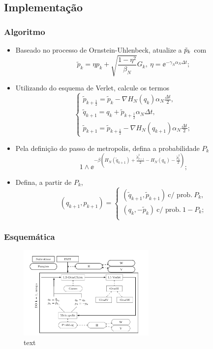 \subsection{Implementação}
\begin{frame}
	\frametitle{Algoritmo}
	
		\begin{itemize}		
			\item<1> Baseado no processo de Ornstein-Uhlenbeck, atualize a $\tilde{p}_k$ com
			$$
				\tilde{p}_k = \eta p_k + \sqrt{\frac{1-\eta^2}{\beta_N}} G_k, \ \eta = \ee^{-\gamma_N \alpha_N \Delta t};
				\label{Equation: Alg Mehler}
			$$
			\item<2> Utilizando do esquema de Verlet, calcule os termos
			$$
				\begin{cases}
					\tilde{p}_{k+\frac{1}{2}} = \tilde{p}_k - \nabla H_N(q_k) \alpha_N \frac{\Delta t}{2}, \\
					\tilde{q}_{k+1} = q_k + \tilde{p}_{k + \frac{1}{2}} \alpha_N \Delta t, \\
					\tilde{p}_{k+1} = \tilde{p}_{k+\frac{1}{2}} - \nabla H_N(q_{k+1}) \alpha_N \frac{\Delta t}{2};
					\label{Equation: Alg Verlet}
				\end{cases}
			$$
			\item<3> Pela definição do passo de metropolis, defina a probabilidade $P_k$
			$$
				1 \wedge \ee^{ -\beta \left( H_N(\tilde{q}_{k+1}) + \frac{\tilde{p}^2_{k+1}}{2} - H_N(q_k) - \frac{\tilde{p}^2_k}{2} \right) };
			$$
			\item<4> Defina, a partir de $P_k$, 
			$$
				(q_{k+1}, p_{k+1}) = 
				\begin{cases}
					(\tilde{q}_{k+1}, \tilde{p}_{k+1}) \ \text{c/ prob.} \ P_k, \\
					(q_k, -\tilde{p}_{k}) \ \text{c/ prob.} \ 1-P_k; \\
				\end{cases}
			$$
		\end{itemize}

\end{frame}
\begin{frame}
	\frametitle{Esquemática}
	\begin{figure}
		\centering
		\includegraphics[width=0.6\textwidth]{./media/Results/Esquematics}	
		\caption{text}
	\end{figure}
\end{frame}

